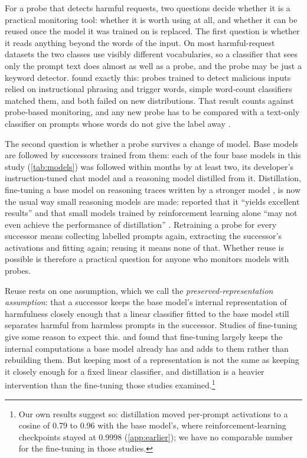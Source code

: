 \documentclass[10pt]{article}
\begin{document}
For a probe that detects harmful requests, two questions decide whether it is a practical monitoring tool: whether it is worth using at all, and whether it can be reused once the model it was trained on is replaced. The first question is whether it reads anything beyond the words of the input. On most harmful-request datasets the two classes use visibly different vocabularies, so a classifier that sees only the prompt text does almost as well as a probe, and the probe may be just a keyword detector. \citet{wang2025} found exactly this: probes trained to detect malicious inputs relied on instructional phrasing and trigger words, simple word-count classifiers matched them, and both failed on new distributions. That result counts against probe-based monitoring, and any new probe has to be compared with a text-only classifier on prompts whose words do not give the label away \citep{gururangan2018}.

The second question is whether a probe survives a change of model. Base models are followed by successors trained from them: each of the four base models in this study (\cref{tab:models}) was followed within months by at least two, its developer's instruction-tuned chat model and a reasoning model distilled from it. Distillation, fine-tuning a base model on reasoning traces written by a stronger model \citep{hinton2015}, is now the usual way small reasoning models are made: \citet{deepseek2025} reported that it ``yields excellent results'' and that small models trained by reinforcement learning alone ``may not even achieve the performance of distillation'' \citep[see also][]{hu2025}. Retraining a probe for every successor means collecting labelled prompts again, extracting the successor's activations and fitting again; reusing it means none of that. Whether reuse is possible is therefore a practical question for anyone who monitors models with probes.

Reuse rests on one assumption, which we call the \emph{preserved-representation assumption}: that a successor keeps the base model's internal representation of harmfulness closely enough that a linear classifier fitted to the base model still separates harmful from harmless prompts in the successor. Studies of fine-tuning give some reason to expect this. \citet{jain2024} and \citet{prakash2024} found that fine-tuning largely keeps the internal computations a base model already has and adds to them rather than rebuilding them. But keeping most of a representation is not the same as keeping it closely enough for a fixed linear classifier, and distillation is a heavier intervention than the fine-tuning those studies examined.\footnote{Our own results suggest so: distillation moved per-prompt activations to a cosine of 0.79 to 0.96 with the base model's, where reinforcement-learning checkpoints stayed at 0.9998 (\cref{app:earlier}); we have no comparable number for the fine-tuning in those studies.}
\end{document}

